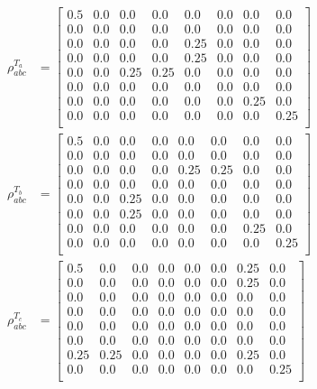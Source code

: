\documentclass{scrartcl}
\begin{document}
\begin{align*}
    \rho^{T_a}_{abc} &=
    \left[
    \begin{array}{cccccccc}
    0.5 & 0.0 & 0.0 & 0.0 & 0.0 & 0.0 & 0.0 & 0.0 \\
    0.0 & 0.0 & 0.0 & 0.0 & 0.0 & 0.0 & 0.0 & 0.0 \\
    0.0 & 0.0 & 0.0 & 0.0 & 0.25 & 0.0 & 0.0 & 0.0 \\
    0.0 & 0.0 & 0.0 & 0.0 & 0.25 & 0.0 & 0.0 & 0.0 \\
    0.0 & 0.0 & 0.25 & 0.25 & 0.0 & 0.0 & 0.0 & 0.0 \\
    0.0 & 0.0 & 0.0 & 0.0 & 0.0 & 0.0 & 0.0 & 0.0 \\
    0.0 & 0.0 & 0.0 & 0.0 & 0.0 & 0.0 & 0.25 & 0.0 \\
    0.0 & 0.0 & 0.0 & 0.0 & 0.0 & 0.0 & 0.0 & 0.25 \\
    \end{array}
    \right]
    \\
    \rho^{T_b}_{abc} &=
    \left[
    \begin{array}{cccccccc}
    0.5 & 0.0 & 0.0 & 0.0 & 0.0 & 0.0 & 0.0 & 0.0 \\
    0.0 & 0.0 & 0.0 & 0.0 & 0.0 & 0.0 & 0.0 & 0.0 \\
    0.0 & 0.0 & 0.0 & 0.0 & 0.25 & 0.25 & 0.0 & 0.0 \\
    0.0 & 0.0 & 0.0 & 0.0 & 0.0 & 0.0 & 0.0 & 0.0 \\
    0.0 & 0.0 & 0.25 & 0.0 & 0.0 & 0.0 & 0.0 & 0.0 \\
    0.0 & 0.0 & 0.25 & 0.0 & 0.0 & 0.0 & 0.0 & 0.0 \\
    0.0 & 0.0 & 0.0 & 0.0 & 0.0 & 0.0 & 0.25 & 0.0 \\
    0.0 & 0.0 & 0.0 & 0.0 & 0.0 & 0.0 & 0.0 & 0.25 \\
    \end{array}
    \right]
    \\
    \rho^{T_c}_{abc} &=
    \left[
    \begin{array}{cccccccc}
    0.5 & 0.0 & 0.0 & 0.0 & 0.0 & 0.0 & 0.25 & 0.0 \\
    0.0 & 0.0 & 0.0 & 0.0 & 0.0 & 0.0 & 0.25 & 0.0 \\
    0.0 & 0.0 & 0.0 & 0.0 & 0.0 & 0.0 & 0.0 & 0.0 \\
    0.0 & 0.0 & 0.0 & 0.0 & 0.0 & 0.0 & 0.0 & 0.0 \\
    0.0 & 0.0 & 0.0 & 0.0 & 0.0 & 0.0 & 0.0 & 0.0 \\
    0.0 & 0.0 & 0.0 & 0.0 & 0.0 & 0.0 & 0.0 & 0.0 \\
    0.25 & 0.25 & 0.0 & 0.0 & 0.0 & 0.0 & 0.25 & 0.0 \\
    0.0 & 0.0 & 0.0 & 0.0 & 0.0 & 0.0 & 0.0 & 0.25 \\
    \end{array}
    \right]
    \end{align*}
    
\end{document}
